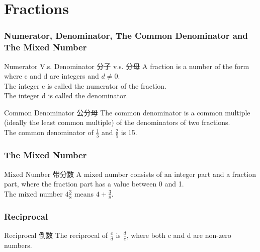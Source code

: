 \documentclass[
	11pt, %
]{beamer}
\begin{document}
\section{Fractions}


\begin{frame}
\frametitle{Numerator, Denominator, The Common Denominator and The Mixed Number}
	\begin{block}{Numerator V.s. Denominator \quad 分子 v.s. 分母}
				A fraction is a number of the form where c and d are integers and \alert{$d\neq 0$}. \\
				The integer c is called the numerator of the fraction. \\  
				The integer d is called the denominator.
	\end{block}

	\begin{block}{Common Denominator \quad 公分母}
				The common denominator is a common multiple (ideally the least common multiple) of the denominators of two fractions.\\
				The common denominator of $\frac{1}{3}$ and $\frac{2}{5}$ is 15.
	\end{block}


\end{frame}

\begin{frame}
\frametitle{ The Mixed Number}

	\begin{block}{Mixed Number \quad 带分数}
	A mixed number consists of an integer part and a fraction part, where the fraction part has a value \alert{between 0 and 1}.\\
	The mixed number $4\frac{3}{8}$ means $4 + \frac{3}{8}$.
	\end{block}
\end{frame}

	

\begin{frame}
\frametitle{Reciprocal}

	\begin{block}{Reciprocal \quad 倒数}
	The reciprocal of $\frac{c}{d}$ is $\frac{d}{c}$, where both c and d are \alert{non-zero} numbers. 
	\end{block}
\end{frame}

	
\end{document}
